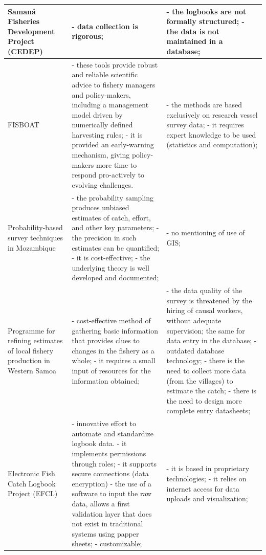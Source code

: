 \documentclass[11pt]{article} %
\begin{document}
\begin{center}
\begin{supertabular}{ | p{0.3\textwidth} | p{0.3\textwidth} | p{0.3\textwidth} |}
Samaná Fisheries Development Project (CEDEP) & - data collection is rigorous; & - the logbooks are not formally structured; - the data is not maintained in a database; \\ \hline
FISBOAT & - these tools provide robust and reliable scientific advice to fishery managers and policy-makers, including a management model driven by numerically defined harvesting rules; - it is provided an early-warning mechanism, giving policy-makers more time to respond pro-actively to evolving challenges. & - the methods are based exclusively on research vessel survey data; - it requires expert knowledge to be used (statistics and computation); \\ \hline
Probability-based survey techniques in Mozambique & - the probability sampling produces unbiased estimates of catch, effort, and other key parameters; - the precision in such estimates can be quantified; - it is cost-effective; - the underlying theory is well developed and documented; & - no mentioning of use of GIS; \\ \hline
Programme for refining estimates of local fishery production in Western Samoa & - cost-effective method of gathering basic information that provides clues to changes in the fishery as a whole; - it requires a small input of resources for the information obtained; & - the data quality of the survey is threatened by the hiring of causal workers, without adequate supervision; the same for data entry in the database; - outdated database technology; - there is the need to collect more data (from the villages) to estimate the catch; - there is the need to design more complete entry datasheets; \\ \hline
Electronic Fish Catch Logbook Project (EFCL) & - innovative effort to automate and standardize logbook data. - it implements permissions through roles; - it supports secure connections (data encryption) - the use of a software to input the raw data, allows a first validation layer that does not exist in traditional systems using papper sheets; - customizable;  & - it is based in proprietary technologies; - it relies on internet access for data uploads and visualization; \\ \hline
\end{supertabular}
\end{center}
\end{document}
